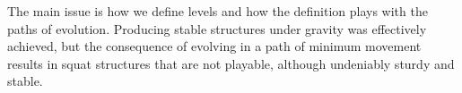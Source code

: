 \documentclass[sigconf]{acmart}
\begin{document}

The main issue is how we define levels and how the definition %
plays
with the paths of evolution.
Producing stable structures under gravity was %
effectively
achieved, but the consequence of evolving in a path of minimum movement 
results in squat
structures that are %
not playable,
although undeniably sturdy and stable. %
\end{document}
